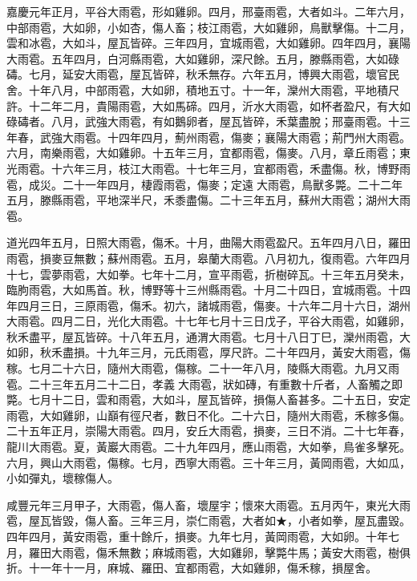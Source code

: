 \begin{pinyinscope}
嘉慶元年正月，平谷大雨雹，形如雞卵。四月，邢臺雨雹，大者如斗。二年六月，中部雨雹，大如卵，小如杏，傷人畜；枝江雨雹，大如雞卵，鳥獸擊傷。十二月，雲和冰雹，大如斗，屋瓦皆碎。三年四月，宜城雨雹，大如雞卵。四年四月，襄陽大雨雹。五年四月，白河縣雨雹，大如雞卵，深尺餘。五月，滕縣雨雹，大如碌碡。七月，延安大雨雹，屋瓦皆碎，秋禾無存。六年五月，博興大雨雹，壞官民舍。十年八月，中部雨雹，大如卵，積地五寸。十一年，灤州大雨雹，平地積尺許。十二年二月，貴陽雨雹，大如馬碲。四月，沂水大雨雹，如杯者盈尺，有大如碌碡者。八月，武強大雨雹，有如鵝卵者，屋瓦皆碎，禾葉盡脫；邢臺雨雹。十三年春，武強大雨雹。十四年四月，薊州雨雹，傷麥；襄陽大雨雹；荊門州大雨雹。六月，南樂雨雹，大如雞卵。十五年三月，宜都雨雹，傷麥。八月，章丘雨雹；東光雨雹。十六年三月，枝江大雨雹。十七年三月，宜都雨雹，禾盡傷。秋，博野雨雹，成災。二十一年四月，棲霞雨雹，傷麥；定遠大雨雹，鳥獸多斃。二十二年五月，滕縣雨雹，平地深半尺，禾黍盡傷。二十三年五月，蘇州大雨雹；湖州大雨雹。

道光四年五月，日照大雨雹，傷禾。十月，曲陽大雨雹盈尺。五年四月八日，羅田雨雹，損麥豆無數；蘇州雨雹。五月，皋蘭大雨雹。八月初九，復雨雹。六年四月十七，雲夢雨雹，大如拳。七年十二月，宣平雨雹，折樹碎瓦。十三年五月癸未，臨朐雨雹，大如馬首。秋，博野等十三州縣雨雹。十月二十四日，宜城雨雹。十四年四月三日，三原雨雹，傷禾。初六，諸城雨雹，傷麥。十六年二月十六日，湖州大雨雹。四月二日，光化大雨雹。十七年七月十三日戊子，平谷大雨雹，如雞卵，秋禾盡平，屋瓦皆碎。十八年五月，通渭大雨雹。七月十八日丁巳，灤州雨雹，大如卵，秋禾盡損。十九年三月，元氏雨雹，厚尺許。二十年四月，黃安大雨雹，傷稼。七月二十六日，隨州大雨雹，傷稼。二十一年八月，陵縣大雨雹。九月又雨雹。二十三年五月二十二日，孝義大雨雹，狀如磚，有重數十斤者，人畜觸之即斃。七月十二日，雲和雨雹，大如斗，屋瓦皆碎，損傷人畜甚多。二十五日，安定雨雹，大如雞卵，山巔有徑尺者，數日不化。二十六日，隨州大雨雹，禾稼多傷。二十五年正月，崇陽大雨雹。四月，安丘大雨雹，損麥，三日不消。二十七年春，龍川大雨雹。夏，黃巖大雨雹。二十九年四月，應山雨雹，大如拳，鳥雀多擊死。六月，興山大雨雹，傷稼。七月，西寧大雨雹。三十年三月，黃岡雨雹，大如瓜，小如彈丸，壞稼傷人。

咸豐元年三月甲子，大雨雹，傷人畜，壞屋宇；懷來大雨雹。五月丙午，東光大雨雹，屋瓦皆毀，傷人畜。三年三月，崇仁雨雹，大者如★，小者如拳，屋瓦盡毀。四年四月，黃安雨雹，重十餘斤，損麥。九年七月，黃岡雨雹，大如卵。十年七月，羅田大雨雹，傷禾無數；麻城雨雹，大如雞卵，擊斃牛馬；黃安大雨雹，樹俱折。十一年十一月，麻城、羅田、宜都雨雹，大如雞卵，傷禾稼，損屋舍。


\end{pinyinscope}
